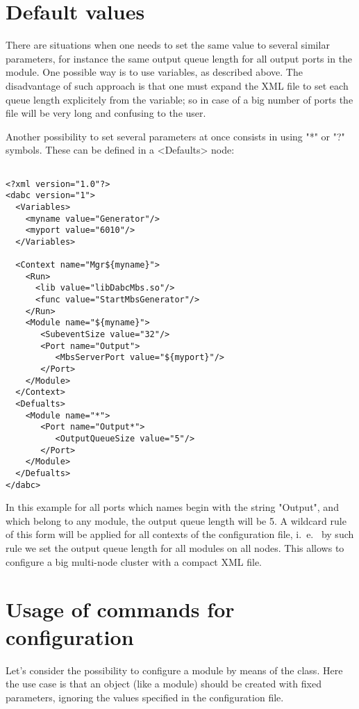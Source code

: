 \section{Default values}
\label{prog_setup_configfile_defaults}
There are situations when one needs to set the same value to several similar parameters,
for instance the same output queue length for all output ports in the module. One possible way is to use variables, as described above. 
The disadvantage of such approach is that one must expand the XML file
to set each queue length explicitely from the variable;
so in case of a big number of ports the file will be very long and 
confusing to the user.

Another possibility to set several parameters at once 
consists in  using "*" or "?" symbols.
These can be defined in a  <Defaults> node: 

\begin{verbatim}

<?xml version="1.0"?>
<dabc version="1">
  <Variables>
    <myname value="Generator"/> 
    <myport value="6010"/> 
  </Variables>

  <Context name="Mgr${myname}">
    <Run>
      <lib value="libDabcMbs.so"/>
      <func value="StartMbsGenerator"/>
    </Run>
    <Module name="${myname}">
       <SubeventSize value="32"/>
       <Port name="Output">
          <MbsServerPort value="${myport}"/>
       </Port>
    </Module>
  </Context>
  <Defualts>
    <Module name="*">
       <Port name="Output*">
          <OutputQueueSize value="5"/>
       </Port>
    </Module>
  </Defualts>
</dabc>

\end{verbatim}

In this example for all ports which names begin with the string "Output", 
and which belong to any module, the output queue length will be 5. 
A wildcard rule of this form will be applied for 
all contexts of the configuration file, 
i.~e.~ by such rule we set the output queue length for all modules on all nodes. 
This allows to configure a big multi-node cluster with
a compact XML file.


\section{Usage of commands for configuration}
\label{prog_setup_configuration_commands}
Let's consider the possibility to configure a module by means of the  class.
Here the use case is that
an object (like a module) should be created with fixed parameters,
ignoring the values specified in the configuration file.

